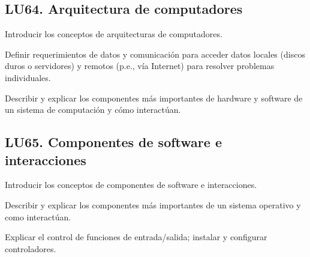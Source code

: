 \subsection{LU64. Arquitectura de computadores}\label{sec:BOK-LU64}\label{sec:LU64}
\begin{LearningUnit}
\begin{LUGoal}
\item Introducir los conceptos de arquitecturas de computadores.
\end{LUGoal}

\begin{LUObjective}
\item Definir requerimientos de datos y comunicación para acceder datos locales (discos duros o servidores) y remotos (p.e., vía Internet) para resolver problemas individuales.
\item Describir y explicar los componentes más importantes de hardware y software de un sistema de computación y cómo interactúan.
\end{LUObjective}
\end{LearningUnit}

\subsection{LU65. Componentes de software e interacciones}\label{sec:BOK-LU65}\label{sec:LU65}
\begin{LearningUnit}
\begin{LUGoal}
\item Introducir los conceptos de componentes de software e interacciones.
\end{LUGoal}

\begin{LUObjective}
\item Describir y explicar los componentes más importantes de un sistema operativo y como interactúan.
\item Explicar el control de funciones de entrada/salida; instalar y configurar controladores.
\end{LUObjective}
\end{LearningUnit}

